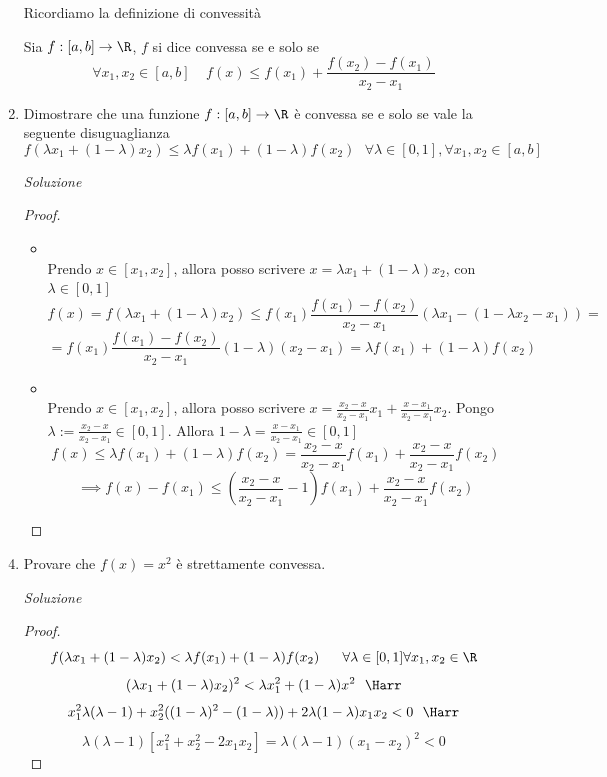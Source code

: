 \documentclass{article}
\begin{document}
\begin{enumerate}[label=\textbf{Esercizio 12.\arabic*.},itemindent=*]
Ricordiamo la definizione di convessità
\begin{shaded}
    \begin{definition}[Convessità]
        Sia $f:[a,b]\to\R$, $f$ si dice convessa se e solo se
        \[\forall x_1,x_2\in [a,b]~~~~~f(x)\leq f(x_1)+\frac{f(x_2)-f(x_1)}{x_2-x_1}\]
    \end{definition}
\end{shaded}
\item Dimostrare che una funzione $f:[a,b]\to\R$ è convessa se e solo se vale la seguente disuguaglianza
\[f(\lambda x_1+(1-\lambda)x_2)\leq \lambda f(x_1)+(1-\lambda)f(x_2)~~~\forall \lambda \in [0,1], \forall x_1,x_2\in [a,b]\]
\item[\textit{\large Soluzione~}]~
\begin{proof}~
    \begin{itemize}
        \item \say{$\Rightarrow$}\\
        Prendo $x \in [x_1,x_2]$, allora posso scrivere $x=\lambda x_1+(1-\lambda)x_2$, con $\lambda\in[0,1]$
        \[f(x)=f(\lambda x_1+(1-\lambda)x_2)\leq f(x_1)\frac{f(x_1)-f(x_2)}{x_2-x_1}(\lambda x_1-(1-\lambda x_2-x_1))=\]\[=f(x_1)\frac{f(x_1)-f(x_2)}{x_2-x_1}(1-\lambda)(x_2-x_1)=\lambda f(x_1)+(1-\lambda)f(x_2)\]
        \item \say{$\Leftarrow$}\\Prendo $x \in [x_1,x_2]$, allora posso scrivere $x=\frac{x_2-x}{x_2-x_1}x_1+\frac{x-x_1}{x_2-x_1}x_2$. Pongo $\lambda:=\frac{x_2-x}{x_2-x_1}\in[0,1]$. Allora $1-\lambda=\frac{x-x_1}{x_2-x_1}\in [0,1]$
        \[f(x)\leq \lambda f(x_1)+(1-\lambda)f(x_2)=\frac{x_2-x}{x_2-x_1}f(x_1)+\frac{x_2-x}{x_2-x_1}f(x_2)\]
        \[\implies f(x)-f(x_1)\leq (\frac{x_2-x}{x_2-x_1}-1)f(x_1)+\frac{x_2-x}{x_2-x_1}f(x_2)\]
    \end{itemize}
\end{proof}
\item Provare che $f(x)=x^2$ è strettamente convessa.
\item[\textit{\large Soluzione~}]~
\begin{proof}
    \[f(\lambda x_1+(1-\lambda)x_2)<\lambda f(x_1)+(1-\lambda)f(x_2)~~~~~\forall \lambda \in [0,1]\forall x_1,x_2\in \R\]
    \[(\lambda x_1+(1-\lambda)x_2)^2<\lambda x_1^2+(1-\lambda)x^2~~\Harr\]
    \[x_1^2\lambda(\lambda-1)+x_2^2((1-\lambda)^2-(1-\lambda))+2\lambda(1-\lambda)x_1x_2<0~~\Harr\]
    \[\lambda(\lambda-1)[x_1^2+x_2^2-2x_1x_2]=\lambda(\lambda-1)(x_1-x_2)^2<0\]

\end{proof}
\end{enumerate}
\end{document}
